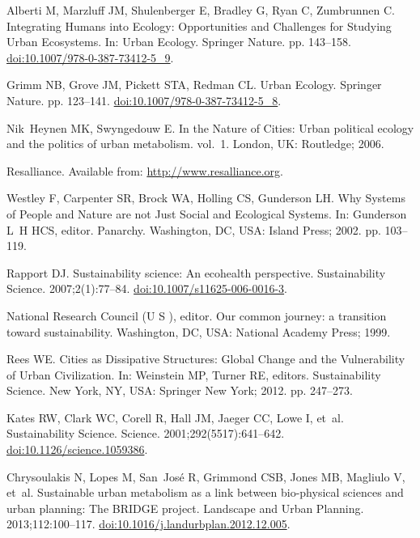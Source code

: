 \documentclass[10pt,a4paper]{article}
\begin{document}
\begin{multicols}{2}
\begin{footnotesize}
\begin{thebibliography}{100}
Alberti M, Marzluff JM, Shulenberger E, Bradley G, Ryan C, Zumbrunnen C.
\newblock Integrating Humans into Ecology: Opportunities and Challenges for
  Studying Urban Ecosystems.
\newblock In: Urban Ecology. Springer Nature. pp. 143--158.
\newblock
  \href{https://doi.org/10.1007/978-0-387-73412-5\_9}{doi:10.1007/978-0-387-73412-5\_9}.

Grimm NB, Grove JM, Pickett STA, Redman CL.
\newblock Urban Ecology.
\newblock Springer Nature. pp. 123--141.
\newblock
  \href{https://doi.org/10.1007/978-0-387-73412-5\_8}{doi:10.1007/978-0-387-73412-5\_8}.

Nik~Heynen MK, Swyngedouw E.
\newblock In the {Nature} of {Cities}: {Urban} political ecology and the
  politics of urban metabolism. vol.~1.
\newblock London, UK: Routledge; 2006.

Resalliance.
\newblock Available from: \url{http://www.resalliance.org}.

Westley F, Carpenter SR, Brock WA, Holling CS, Gunderson LH.
\newblock Why {Systems} of {People} and {Nature} are not {Just} {Social} and
  {Ecological} {Systems}.
\newblock In: Gunderson L~H HCS, editor. Panarchy. Washington, DC, USA: Island
  Press; 2002. pp. 103--119.

Rapport DJ.
\newblock Sustainability science: An ecohealth perspective.
\newblock Sustainability Science. 2007;2(1):77--84.
\newblock
  \href{https://doi.org/10.1007/s11625-006-0016-3}{doi:10.1007/s11625-006-0016-3}.

{National Research Council (U S )}, editor.
\newblock Our common journey: a transition toward sustainability.
\newblock Washington, DC, USA: National Academy Press; 1999.

Rees WE.
\newblock Cities as {Dissipative} {Structures}: {Global} {Change} and the
  {Vulnerability} of {Urban} {Civilization}.
\newblock In: Weinstein MP, Turner RE, editors. Sustainability {Science}. New
  York, NY, USA: Springer New York; 2012. pp. 247--273.

Kates RW, Clark WC, Corell R, Hall JM, Jaeger CC, Lowe I, et~al.
\newblock Sustainability Science.
\newblock Science. 2001;292(5517):641--642.
\newblock
  \href{https://doi.org/10.1126/science.1059386}{doi:10.1126/science.1059386}.

Chrysoulakis N, Lopes M, San~José R, Grimmond CSB, Jones MB, Magliulo V,
  et~al.
\newblock Sustainable urban metabolism as a link between bio-physical sciences
  and urban planning: {The} {BRIDGE} project.
\newblock Landscape and Urban Planning. 2013;112:100--117.
\newblock
  \href{https://doi.org/10.1016/j.landurbplan.2012.12.005}{doi:10.1016/j.landurbplan.2012.12.005}.


\end{thebibliography}
\end{footnotesize}
\end{multicols}
\end{document}
